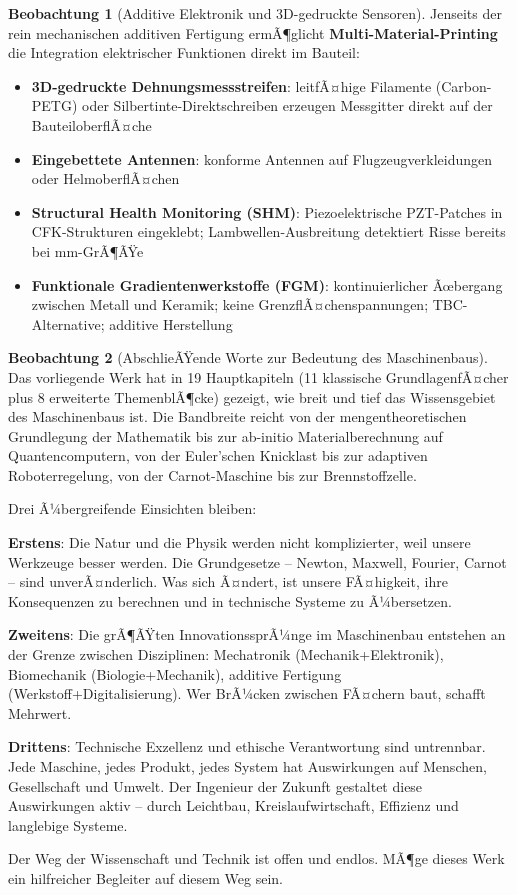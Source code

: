 ﻿\documentclass[a4paper,12pt]{report}
\theoremstyle{definition}
\newtheorem{beobachtung}{Beobachtung}
\begin{document}
\begin{beobachtung}[Additive Elektronik und 3D-gedruckte Sensoren]
Jenseits der rein mechanischen additiven Fertigung ermÃ¶glicht
\textbf{Multi-Material-Printing} die Integration elektrischer Funktionen
direkt im Bauteil:
\begin{itemize}
    \item[-] \textbf{3D-gedruckte Dehnungsmessstreifen}: leitfÃ¤hige
          Filamente (Carbon-PETG) oder Silbertinte-Direktschreiben
          erzeugen Messgitter direkt auf der BauteiloberflÃ¤che
    \item[-] \textbf{Eingebettete Antennen}: konforme Antennen auf
          Flugzeugverkleidungen oder HelmoberflÃ¤chen
    \item[-] \textbf{Structural Health Monitoring (SHM)}: Piezoelektrische
          PZT-Patches in CFK-Strukturen eingeklebt; Lambwellen-Ausbreitung
          detektiert Risse bereits bei mm-GrÃ¶ÃŸe
    \item[-] \textbf{Funktionale Gradientenwerkstoffe (FGM)}:
          kontinuierlicher Ãœbergang zwischen Metall und Keramik;
          keine GrenzflÃ¤chenspannungen; TBC-Alternative; additive Herstellung
\end{itemize}
\end{beobachtung}

\begin{beobachtung}[AbschlieÃŸende Worte zur Bedeutung des Maschinenbaus]
Das vorliegende Werk hat in 19 Hauptkapiteln (11 klassische GrundlagenfÃ¤cher
plus 8 erweiterte ThemenblÃ¶cke) gezeigt, wie breit und tief das
Wissensgebiet des Maschinenbaus ist. Die Bandbreite reicht von
der mengentheoretischen Grundlegung der Mathematik bis zur
ab-initio Materialberechnung auf Quantencomputern, von der
Euler'schen Knicklast bis zur adaptiven Roboterregelung,
von der Carnot-Maschine bis zur Brennstoffzelle.

Drei Ã¼bergreifende Einsichten bleiben:

\medskip
\noindent\textbf{Erstens}: Die Natur und die Physik werden nicht
komplizierter, weil unsere Werkzeuge besser werden. Die Grundgesetze --
Newton, Maxwell, Fourier, Carnot -- sind unverÃ¤nderlich.
Was sich Ã¤ndert, ist unsere FÃ¤higkeit, ihre Konsequenzen zu berechnen
und in technische Systeme zu Ã¼bersetzen.

\medskip
\noindent\textbf{Zweitens}: Die grÃ¶ÃŸten InnovationssprÃ¼nge im Maschinenbau
entstehen an der Grenze zwischen Disziplinen: Mechatronik (Mechanik+Elektronik),
Biomechanik (Biologie+Mechanik), additive Fertigung (Werkstoff+Digitalisierung).
Wer BrÃ¼cken zwischen FÃ¤chern baut, schafft Mehrwert.

\medskip
\noindent\textbf{Drittens}: Technische Exzellenz und ethische Verantwortung
sind untrennbar. Jede Maschine, jedes Produkt, jedes System hat
Auswirkungen auf Menschen, Gesellschaft und Umwelt.
Der Ingenieur der Zukunft gestaltet diese Auswirkungen aktiv --
durch Leichtbau, Kreislaufwirtschaft, Effizienz und langlebige Systeme.

\medskip
\noindent Der Weg der Wissenschaft und Technik ist offen und endlos.
MÃ¶ge dieses Werk ein hilfreicher Begleiter auf diesem Weg sein.
\end{beobachtung}
\end{document}
